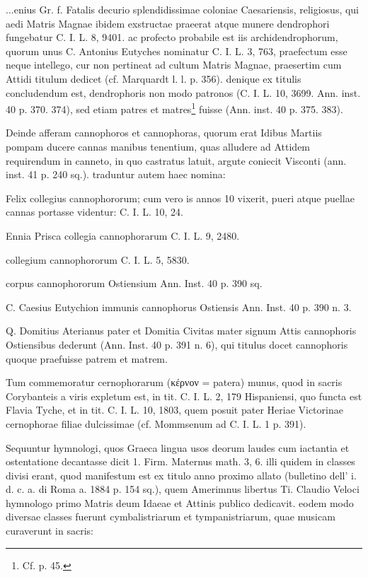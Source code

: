 \documentclass[a4paper, 11pt, oneside, polutonikogreek, german]{article}
\begin{document}
...enius Gr. f. Fatalis decurio splendidissimae coloniae Caesariensis, religiosus, qui aedi Matris Magnae ibidem exstructae praeerat atque munere dendrophori fungebatur C. I. L. 8, 9401. ac profecto probabile est iis archidendrophorum, quorum unus C. Antonius Eutyches nominatur C. I. L. 3, 763, praefectum esse neque intellego, cur non pertineat ad cultum Matris Magnae, praesertim cum Attidi titulum dedicet (cf. Marquardt l. l. p. 356). denique ex titulis concludendum est, dendrophoris non modo patronos (C. I. L. 10, 3699. Ann. inst. 40 p. 370. 374), sed etiam patres et matres\footnote{Cf. p. 45.} fuisse (Ann. inst. 40 p. 375. 383).

Deinde afferam cannophoros et cannophoras, quorum erat Idibus Martiis pompam ducere cannas manibus tenentium, quas alludere ad Attidem requirendum in canneto, in quo castratus latuit, argute coniecit Visconti (ann. inst. 41 p. 240 sq.). traduntur autem haec nomina:

Felix collegius cannophororum; cum vero is annos 10 vixerit, pueri atque puellae cannas portasse videntur: C. I. L. 10, 24.

Ennia Prisca collegia cannophorarum C. I. L. 9, 2480.

collegium cannophororum C. I. L. 5, 5830.

corpus cannophororum Ostiensium Ann. Inst. 40 p. 390 sq.

C. Caesius Eutychion immunis cannophorus Ostiensis Ann. Inst. 40 p. 390 n. 3.

Q. Domitius Aterianus pater et Domitia Civitas mater signum Attis cannophoris Ostiensibus dederunt (Ann. Inst. 40 p. 391 n. 6), qui titulus docet cannophoris quoque praefuisse patrem et matrem.

Tum commemoratur cernophorarum (κέρνον = patera) munus, quod in sacris Corybanteis a viris expletum est, in tit. C. I. L. 2, 179 Hispaniensi, quo functa est Flavia Tyche, et in tit. C. I. L. 10, 1803, quem posuit pater Heriae Victorinae cernophorae filiae dulcissimae (cf. Mommsenum ad C. I. L. 1 p. 391).

Sequuntur hymnologi, quos Graeca lingua usos deorum laudes cum iactantia et ostentatione decantasse dicit 1. Firm. Maternus math. 3, 6. illi quidem in classes divisi erant, quod manifestum est ex titulo anno proximo allato (bulletino dell' i. d. c. a. di Roma a. 1884 p. 154 sq.), quem Amerimnus libertus Ti. Claudio Veloci hymnologo primo Matris deum Idaeae et Attinis publico dedicavit. eodem modo diversae classes fuerunt cymbalistriarum et tympanistriarum, quae musicam curaverunt in sacris:
\end{document}
